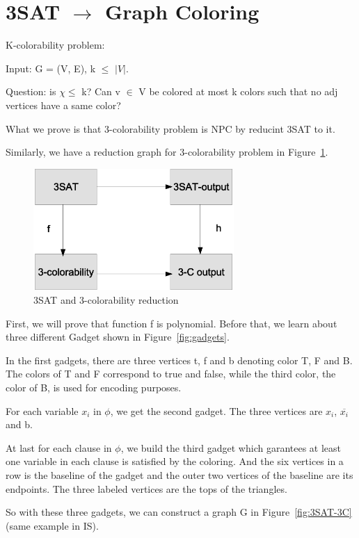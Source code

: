 \documentclass[usletter]{article}
\begin{document}
\section{3SAT $\rightarrow$ Graph Coloring}
K-colorability problem:

Input: G = (V, E), k $\le$ $|V|$.

Question: is $\chi \le$ k? Can v $\in$ V be colored at most k colors such that no adj vertices have a same color?

What we prove is that 3-colorability problem is NPC by reducint 3SAT to it.

Similarly, we have a reduction graph for 3-colorability problem in Figure~\ref{fig:reduction-3C}.

\begin{figure}[bht]
\begin{center}
     \includegraphics[width=3.0in]{figures/reduction-3C}
\caption{\label{fig:reduction-3C}3SAT and 3-colorability reduction}
\end{center}
\end{figure}

First, we will prove that function f is polynomial.
Before that, we learn about three different Gadget shown in Figure~\ref{fig:gadgets}. 

In the first gadgets, there are three vertices t, f and b denoting color T, F and B. The colors of T and F correspond to true and false, while the third color, the color of B, is used for encoding purposes.

For each variable $x_{i}$ in $\phi$, we get the second gadget. The three vertices are $x_{i}$, $\overline{x_{i}}$ and b.

At last for each clause in $\phi$, we build the third gadget which garantees at least one variable in each clause is satisfied by the coloring. And the six vertices in a row is the baseline of the gadget and the outer two vertices of the baseline are its endpoints. The three labeled vertices are the tops of the triangles.

So with these three gadgets, we can construct a graph G in Figure~\ref{fig:3SAT-3C} (same example in IS). 
\end{document}
